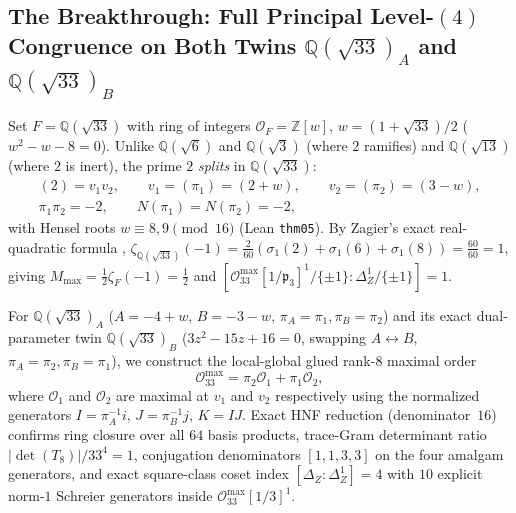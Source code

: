 \documentclass[11pt]{amsart}
\numberwithin{equation}{section}
\theoremstyle{plain}
\theoremstyle{definition}\newtheorem{definition}[theorem]{Definition}
\theoremstyle{remark}\newtheorem{remark}[theorem]{Remark}
\newcommand{\Q}{\mathbb{Q}}
\newcommand{\Z}{\mathbb{Z}}
\newcommand{\calO}{\mathcal{O}}
\newcommand{\frp}{\mathfrak{p}}
\begin{document}
\subsection{The Breakthrough: Full Principal Level-\texorpdfstring{$(4)$}{(4)} Congruence on Both Twins \texorpdfstring{$\Q(\sqrt{33})_A$}{Q(sqrt(33))A} and \texorpdfstring{$\Q(\sqrt{33})_B$}{Q(sqrt(33))B}}

Set $F = \Q(\sqrt{33})$ with ring of integers $\calO_F = \Z[w]$, $w = (1+\sqrt{33})/2$ ($w^2 - w - 8 = 0$). Unlike $\Q(\sqrt{6})$ and $\Q(\sqrt{3})$ (where $2$ ramifies) and $\Q(\sqrt{13})$ (where $2$ is inert), the prime $2$ \emph{splits} in $\Q(\sqrt{33})$:
\begin{equation}\label{eq:q33_split}
\begin{gathered}
(2) = v_1 v_2, \qquad v_1 = (\pi_1) = (2+w), \qquad v_2 = (\pi_2) = (3-w), \\
\pi_1 \pi_2 = -2, \qquad N(\pi_1) = N(\pi_2) = -2,
\end{gathered}
\end{equation}
with Hensel roots $w \equiv 8, 9 \pmod{16}$ (Lean \texttt{thm05}). By Zagier's exact real-quadratic formula \cite{zagier1976}, $\zeta_{\Q(\sqrt{33})}(-1) = \frac{2}{60}(\sigma_1(2)+\sigma_1(6)+\sigma_1(8)) = \frac{60}{60} = 1$, giving $M_{\max} = \frac{1}{2}\zeta_F(-1) = \frac{1}{2}$ and $[\calO_{33}^{\max}[1/\frp_3]^1/\{\pm 1\} : \Delta_Z^1/\{\pm 1\}] = 1$.

For $\Q(\sqrt{33})_A$ ($A = -4+w$, $B = -3-w$, $\pi_A=\pi_1, \pi_B=\pi_2$) and its exact dual-parameter twin $\Q(\sqrt{33})_B$ ($3z^2-15z+16=0$, swapping $A \leftrightarrow B$, $\pi_A=\pi_2, \pi_B=\pi_1$), we construct the local-global glued rank-$8$ maximal order
\begin{equation}\label{eq:q33_glue}
\calO_{33}^{\max} = \pi_2 \calO_1 + \pi_1 \calO_2,
\end{equation}
where $\calO_1$ and $\calO_2$ are maximal at $v_1$ and $v_2$ respectively using the normalized generators $I = \pi_A^{-1} i$, $J = \pi_B^{-1} j$, $K = IJ$. Exact HNF reduction (denominator~$16$) confirms ring closure over all $64$ basis products, trace-Gram determinant ratio $|\det(T_8)|/33^4 = 1$, conjugation denominators $[1,1,3,3]$ on the four amalgam generators, and exact square-class coset index $[\Delta_Z : \Delta_Z^1] = 4$ with $10$ explicit norm-$1$ Schreier generators inside $\calO_{33}^{\max}[1/3]^1$.
\end{document}
